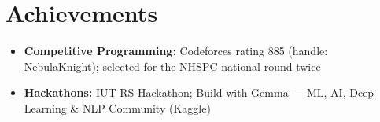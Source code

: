 \documentclass[10.5pt,a4paper]{article}
\begin{document}
\section*{Achievements}
\begin{itemize}
  \item \textbf{Competitive Programming:} Codeforces rating 885 (handle: \href{https://codeforces.com/profile/NebulaKnight}{NebulaKnight}); selected for the NHSPC national round twice
  \item \textbf{Hackathons:} IUT-RS Hackathon; Build with Gemma --- ML, AI, Deep Learning \& NLP Community (Kaggle)
\end{itemize}
\end{document}
